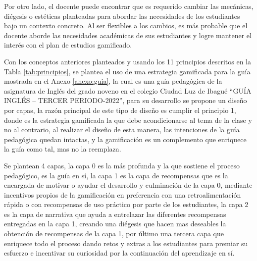 Por otro lado, el docente puede encontrar que es requerido cambiar las mecánicas, diégesis o estéticas 
planteadas para abordar las necesidades de los estudiantes bajo un contexto concreto. Al ser flexibles a los 
cambios, es más probable que el docente aborde las necesidades académicas de sus estudiantes y logre mantener 
el interés con el plan de estudios gamificado.

Con los conceptos anteriores planteados y usando los 11 principios descritos en la Tabla \ref{tab:principios}, 
se plantea el uso de una estrategia gamificada para la guía mostrada en el Anexo \ref{anexo:guia}, la cual es 
una guía pedagógica de la asignatura de Inglés del grado noveno en el colegio Ciudad Luz de Ibagué ``GUÍA 
INGLÉS – TERCER PERIODO-2022'', para su desarrollo se propone un diseño por capas, la razón principal de este 
tipo de diseño es cumplir el principio 1, donde es la estrategia gamificada la que debe acondicionarse al tema 
de la clase y no al contrario, al realizar el diseño de esta manera, las intenciones de la guía pedagógica 
quedan intactas, y la gamificación es un complemento que enriquece la guía como tal, mas no la reemplaza.

Se plantean 4 capas, la capa 0 es la más profunda y la que sostiene el proceso pedagógico, es la guía en sí, 
la capa 1 es la capa de recompensas que es la encargada de motivar o ayudar el desarrollo y culminación de la 
capa 0, mediante incentivos propios de la gamificación en preferencia con una retroalimentación rápida o con 
recompensas de uso práctico por parte de los estudiantes, la capa 2 es la capa de narrativa que ayuda a 
entrelazar las diferentes recompensas entregadas en la capa 1, creando una diégesis que hacen mas deseables la 
obtención de recompensas de la capa 1, por último una tercera capa que enriquece todo el proceso dando retos y 
extras a los estudiantes para premiar su esfuerzo e incentivar su curiosidad por la continuación del 
aprendizaje en sí.


